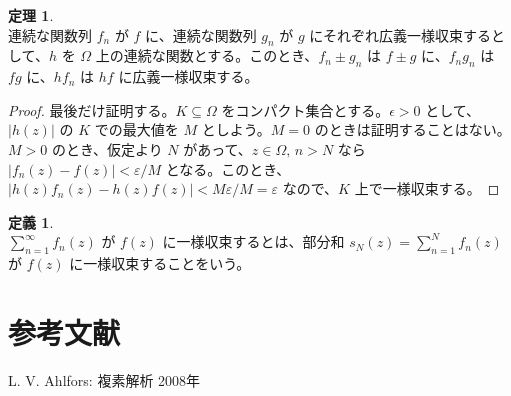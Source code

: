 \documentclass{jsarticle}
\theoremstyle{definition}
\newtheorem*{definition*}{定義}
\newtheorem{theorem}{定理}[section]
\begin{document}
    \begin{theorem} \ \\
        連続な関数列 $f_n$ が $f$ に、連続な関数列 $g_n$ が $g$ にそれぞれ広義一様収束するとして、$h$ を $\Omega$ 上の連続な関数とする。このとき、$f_n \pm g_n$ は $f \pm g$ に、$f_ng_n$ は $fg$ に、$hf_n$ は $hf$ に広義一様収束する。
    \end{theorem}
    \begin{proof}
        最後だけ証明する。$K \subseteq \Omega$ をコンパクト集合とする。$\epsilon > 0$ として、$|h(z)|$ の $K$ での最大値を $M$ としよう。$M = 0$ のときは証明することはない。\\
        $M > 0$ のとき、仮定より $N$ があって、$z\in\Omega, \, n > N$ なら $|f_n(z) - f(z)| < \varepsilon/M$ となる。このとき、$|h(z)f_n(z) - h(z)f(z)| < M \varepsilon/M = \varepsilon$ なので、$K$ 上で一様収束する。
    \end{proof}
    
    \begin{definition*} \ \\
    $\displaystyle \sum_{n=1}^{\infty} f_n(z)$ が $f(z)$ に一様収束するとは、部分和 $s_N(z) = \displaystyle \sum_{n=1}^{N} f_n(z)$ が $f(z)$ に一様収束することをいう。
    \end{definition*}
  
  \section{参考文献}
    \begin{enumerate}[\textrm{[}1\textrm{]}]
        \item L. V. Ahlfors: 複素解析 2008年
    \end{enumerate}
\end{document}
